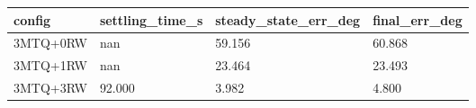 \begin{tabular}{llll}
\hline
config & settling\_time\_s & steady\_state\_err\_deg & final\_err\_deg \\
\hline
3MTQ+0RW & nan & 59.156 & 60.868 \\
3MTQ+1RW & nan & 23.464 & 23.493 \\
3MTQ+3RW & 92.000 & 3.982 & 4.800 \\
\hline
\end{tabular}
